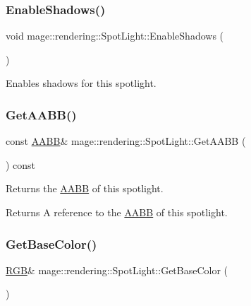 \subsubsection{\texorpdfstring{Enable\+Shadows()}{EnableShadows()}}
{\footnotesize\ttfamily void mage\+::rendering\+::\+Spot\+Light\+::\+Enable\+Shadows (\begin{DoxyParamCaption}{ }\end{DoxyParamCaption})\hspace{0.3cm}{\ttfamily [noexcept]}}

Enables shadows for this spotlight. \hypertarget{classmage_1_1rendering_1_1_spot_light_a09e58c11a2f81de811c4d8e51c5d13c3}{}\label{classmage_1_1rendering_1_1_spot_light_a09e58c11a2f81de811c4d8e51c5d13c3} 
\subsubsection{\texorpdfstring{Get\+A\+A\+B\+B()}{GetAABB()}}
{\footnotesize\ttfamily const \hyperlink{classmage_1_1_a_a_b_b}{A\+A\+BB}\& mage\+::rendering\+::\+Spot\+Light\+::\+Get\+A\+A\+BB (\begin{DoxyParamCaption}{ }\end{DoxyParamCaption}) const\hspace{0.3cm}{\ttfamily [noexcept]}}

Returns the \hyperlink{classmage_1_1_a_a_b_b}{A\+A\+BB} of this spotlight.

\begin{DoxyReturn}{Returns}
A reference to the \hyperlink{classmage_1_1_a_a_b_b}{A\+A\+BB} of this spotlight. 
\end{DoxyReturn}
\hypertarget{classmage_1_1rendering_1_1_spot_light_ac86581dd4af14206c11470beec10fe02}{}\label{classmage_1_1rendering_1_1_spot_light_ac86581dd4af14206c11470beec10fe02} 
\subsubsection{\texorpdfstring{Get\+Base\+Color()}{GetBaseColor()}\hspace{0.1cm}{\footnotesize\ttfamily [1/2]}}
{\footnotesize\ttfamily \hyperlink{structmage_1_1_r_g_b}{R\+GB}\& mage\+::rendering\+::\+Spot\+Light\+::\+Get\+Base\+Color (\begin{DoxyParamCaption}{ }\end{DoxyParamCaption})\hspace{0.3cm}{\ttfamily [noexcept]}}

